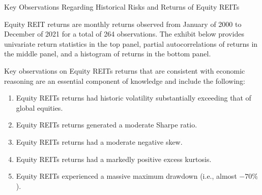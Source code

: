 \documentclass[11pt]{article}
\begin{document}
Key Observations Regarding Historical Risks and Returns of Equity REITs

Equity REIT returns are monthly returns observed from January of 2000 to December of 2021 for a total of 264 observations. The exhibit below provides univariate return statistics in the top panel, partial autocorrelations of returns in the middle panel, and a histogram of returns in the bottom panel.

Key observations on Equity REITs returns that are consistent with economic reasoning are an essential component of knowledge and include the following:

\begin{enumerate}
  \item Equity REITs returns had historic volatility substantially exceeding that of global equities.

  \item Equity REITs returns generated a moderate Sharpe ratio.

  \item Equity REITs returns had a moderate negative skew.

  \item Equity REITs returns had a markedly positive excess kurtosis.

  \item Equity REITs experienced a massive maximum drawdown (i.e., almost $-70 \%$ ).

\end{enumerate}
\end{document}

